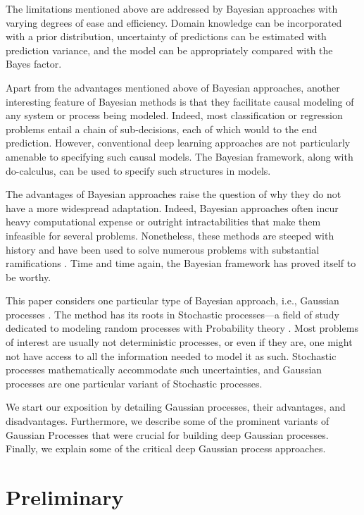 \documentclass[letterpaper,11pt]{extarticle}
\begin{document}
The limitations mentioned above are addressed by Bayesian approaches with varying degrees of ease and efficiency. Domain knowledge can be incorporated with a prior distribution, uncertainty of predictions can be estimated with prediction variance, and the model can be appropriately compared with the Bayes factor.

Apart from the advantages mentioned above of Bayesian approaches, another interesting feature of Bayesian methods is that they facilitate causal modeling \cite{PearlM18} of any system or process being modeled. Indeed, most classification or regression problems entail a chain of sub-decisions, each of which would to the end prediction. However, conventional deep learning approaches are not particularly amenable to specifying such causal models. The Bayesian framework, along with do-calculus, can be used to specify such structures in models. 

The advantages of Bayesian approaches raise the question of why they do not have a more widespread adaptation. Indeed, Bayesian approaches often incur heavy computational expense or outright intractabilities that make them infeasible for several problems. Nonetheless, these methods are steeped with history and have been used to solve numerous problems with substantial ramifications \cite{Mcgrayne11}. Time and time again, the Bayesian framework has proved itself to be worthy. 

This paper considers one particular type of Bayesian approach, i.e., Gaussian processes \cite{RasmussenW06}. The method has its roots in Stochastic processes—a field of study dedicated to modeling random processes with Probability theory \cite{Klebaner12,Rosenthal06}. Most problems of interest are usually not deterministic processes, or even if they are, one might not have access to all the information needed to model it as such. Stochastic processes mathematically accommodate such uncertainties, and Gaussian processes are one particular variant of Stochastic processes. 

We start our exposition by detailing Gaussian processes, their advantages, and disadvantages. Furthermore, we describe some of the prominent variants of Gaussian Processes that were crucial for building deep Gaussian processes. Finally, we explain some of the critical deep Gaussian process approaches. 

\section{Preliminary}
\end{document}
